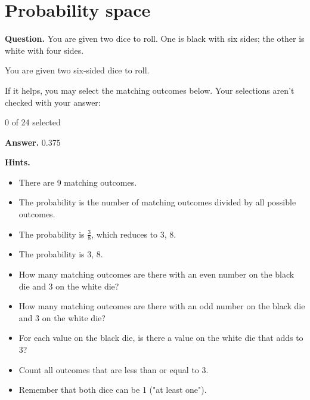 \documentclass{article}
\begin{document}
\section*{Probability space}
\textbf{Question.} You are given two dice to roll. One is black with six sides; the other is white with four sides.
            
            
                You are given two six-sided dice to roll.
            
        
        
        
        If it helps, you may select the matching outcomes below. Your selections
        aren't checked with your answer:

        
            0 of 24 selected

\textbf{Answer.} 0.375

\textbf{Hints.}
\begin{itemize}
  \item There are
                9 matching
                outcomes.
  \item The probability is the number of matching outcomes divided by all possible outcomes.
  \item The probability is $\frac{3}{8}$,
            which reduces to 3, 8.
  \item The probability is 3, 8.
  \item How many matching outcomes are there with an even number on the black die and
                    3 on the white die?
  \item How many matching outcomes are there with an odd number on the black die and
                    3 on the white die?
  \item For each value on the black die, is there a value on the white die that adds to 3?
  \item Count all outcomes that are less than or equal to 3.
  \item Remember that both dice can be 1 ("at least one").
\end{itemize}
\end{document}

